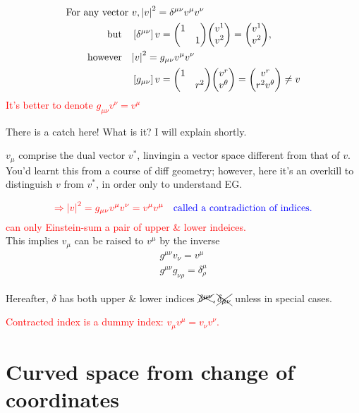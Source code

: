 \documentclass[11pt,fleqn]{book} %
\begin{document}
\begin{align*}
  \text{For any vector\ } & v, \abs{v}^2 = \delta^{\mu\nu} v^\mu v^\nu \\
  \text{but} \quad &\left[ \delta^{\mu\nu} \right] v = \mqty(\dmat{1,1}) \mqty(v^1 \\ v^2) = \mqty(v^1 \\ v^2), \\
  \text{however} \quad & \abs{v}^2 = g_{\mu\nu} v^\mu v^\nu \\
                          & \left[ g_{\mu\nu} \right] v = \mqty(\dmat{1,r^2}) \mqty(v^r \\ v^\theta) = \mqty(v^r \\ r^2 v^\theta) \neq v
\end{align*}
\textcolor{red}{It's better to denote \(g_{\mu\nu} v^\nu = v^\mu\)}
\begin{problem}
  There is a catch here! What is it? I will explain shortly.
\end{problem}
\begin{remark}
  \(v_\mu\) comprise the dual vector \(v^*\), linvingin a vector space different
  from that of \(v\). You'd learnt this from a course of diff geometry; however,
  here it's an overkill to distinguish \(v\) from \(v^*\), in order only to
  understand EG.
\end{remark}
\[\textcolor{red}{\Rightarrow \abs{v}^2 = g_{\mu\nu} v^\mu v^\nu = v^\mu v^\mu} \quad
  \textcolor{blue}{\text{called a contradiction of indices.}} \]
\textcolor{red}{can only Einstein-sum a pair of upper \& lower indeices.} \\
This implies \(v_\mu\) can be raised to \(v^\mu\) by the inverse
\begin{align*}
  g^{\mu\nu} v_\nu = v^\mu \\
  g^{\mu\nu}g_{\nu\rho} = \delta^\mu_\rho
\end{align*}
\begin{remark}
  Hereafter, \(\delta\) has both upper \& lower indices \(\xcancel{\delta^{\mu\nu}}, \xcancel{\delta_{\mu\nu}}\) unless in special cases.
\end{remark}
\textcolor{red}{Contracted index is a dummy index: \(v_\mu v^\mu = v_\nu v^\nu\).}

\section{Curved space from change of coordinates}
\end{document}
